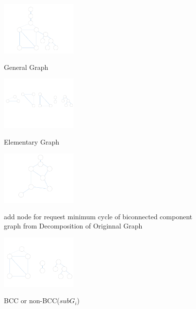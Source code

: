 \begin{figure}
\centering
\includegraphics[width=1.5in]{Fig/DecomposeGraph_orginalgraph}\\
\caption{General Graph}\label{fig:DecomposeGraph_orginalgraph}
\end{figure}
\begin{figure}
\centering
\includegraphics[width=1.5in]{Fig/DecomposeGraph_elementarygraph}\\
\caption{Elementary Graph}\label{fig:DecomposeGraph_elementarygraph}
\end{figure}
\begin{figure}
\centering
\includegraphics[width=1.5in]{Fig/DecomposeGraph_addnode4mimicycle}\\
  \caption{add node for request minimum cycle of biconnected component graph from Decomposition of Originnal Graph}\label{fig:DecomposeGraph_addnode4mimicycle}
\end{figure}
\begin{figure}
\centering
\includegraphics[width=1.5in]{Fig/DecomposeGraph_subbiconnectedgraph}\\
\caption{BCC or non-BCC($subG_i$)}\label{fig:DecomposeGraph_subbiconnectedgraph}
\end{figure}


